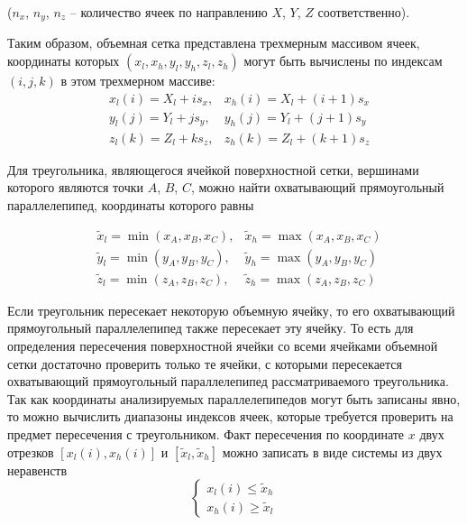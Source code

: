 ($n_x$, $n_y$, $n_z$ -- количество ячеек по направлению $X$, $Y$, $Z$ соответственно).

Таким образом, объемная сетка представлена трехмерным массивом ячеек, координаты которых $(x_l, x_h, y_l, y_h, z_l, z_h)$ могут быть вычислены по индексам $(i, j, k)$ в этом трехмерном массиве:
\begin{equation}
	\begin{aligned}
		& x_l(i) = X_l + i s_x, & x_h(i) = X_l + (i + 1) s_x \\
		& y_l(j) = Y_l + j s_y, & y_h(j) = Y_l + (j + 1) s_y \\
		& z_l(k) = Z_l + k s_z, & z_h(k) = Z_l + (k + 1) s_z		
	\end{aligned}
\end{equation}

Для треугольника, являющегося ячейкой поверхностной сетки, вершинами которого являются точки $A$, $B$, $C$, можно найти охватывающий прямоугольный параллелепипед, координаты которого равны

\begin{equation}
	\begin{aligned}
		& \tilde{x}_l = \min(x_A, x_B, x_C), & \tilde{x}_h = \max(x_A, x_B, x_C) \\
		& \tilde{y}_l = \min(y_A, y_B, y_C), & \tilde{y}_h = \max(y_A, y_B, y_C) \\
		& \tilde{z}_l = \min(z_A, z_B, z_C), & \tilde{z}_h = \max(z_A, z_B, z_C)
	\end{aligned}
\end{equation}

Если треугольник пересекает некоторую объемную ячейку, то его охватывающий прямоугольный параллелепипед также пересекает эту ячейку.
То есть для определения пересечения поверхностной ячейки со всеми ячейками объемной сетки достаточно проверить только те ячейки, с которыми пересекается охватывающий прямоугольный параллелепипед рассматриваемого треугольника.
Так как координаты анализируемых параллелепипедов могут быть записаны явно, то можно вычислить диапазоны индексов ячеек, которые требуется проверить на предмет пересечения с треугольником.
Факт пересечения по координате $x$ двух отрезков $[x_l(i), x_h(i)]$ и $[\tilde{x}_l, \tilde{x}_h]$ можно записать в виде системы из двух неравенств
\begin{equation}\label{eqn:text_4_mesh_intersect_eq2}
	\left\{
		\begin{aligned}
			x_l(i) \le \tilde{x}_h \\
			x_h(i) \ge \tilde{x}_l
		\end{aligned}
	\right.
\end{equation}

